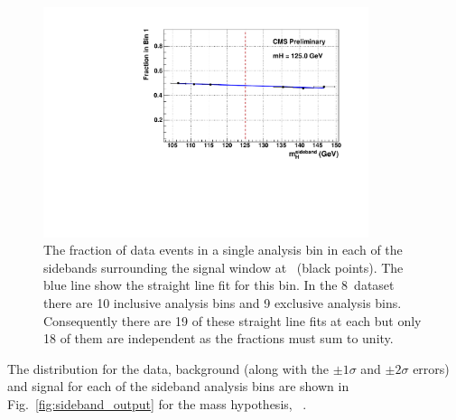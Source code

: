 \begin{figure}
  \begin{center}
    \includegraphics[width=0.85\textwidth]{analysis/plots/sideband/sideband_fit.pdf}
    \caption[An example of one of the sideband fits for the \acs{SMVA}]{The fraction of data events in a single analysis bin in each of the sidebands surrounding the signal window at ~\GeV (black points). The blue line show the straight line fit for this bin. In the 8~\TeV dataset there are 10 inclusive analysis bins and 9 exclusive analysis bins. Consequently there are 19 of these straight line fits at each \mH but only 18 of them are independent as the fractions must sum to unity.}
    \label{fig:sideband_shape}
  \end{center}
\end{figure}

The distribution for the data, background (along with the $\pm1\sigma$ and $\pm2\sigma$ errors) and signal for each of the sideband analysis bins are shown in Fig.~\ref{fig:sideband_output} for the mass hypothesis, ~\GeV.

